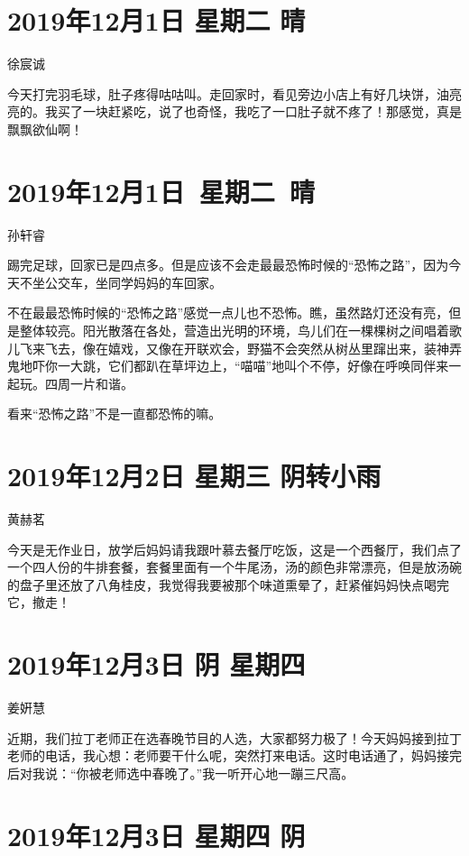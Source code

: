 \section{2019年12月1日 星期二 晴}

徐宸诚

今天打完羽毛球，肚子疼得咕咕叫。走回家时，看见旁边小店上有好几块饼，油亮亮的。我买了一块赶紧吃，说了也奇怪，我吃了一口肚子就不疼了！那感觉，真是飘飘欲仙啊！

\section{2019年12月1日~星期二~晴}

孙轩睿

踢完足球，回家已是四点多。但是应该不会走最最恐怖时候的``恐怖之路''，因为今天不坐公交车，坐同学妈妈的车回家。

不在最最恐怖时候的``恐怖之路''感觉一点儿也不恐怖。瞧，虽然路灯还没有亮，但是整体较亮。阳光散落在各处，营造出光明的环境，鸟儿们在一棵棵树之间唱着歌儿飞来飞去，像在嬉戏，又像在开联欢会，野猫不会突然从树丛里蹿出来，装神弄鬼地吓你一大跳，它们都趴在草坪边上，``喵喵''地叫个不停，好像在呼唤同伴来一起玩。四周一片和谐。

看来``恐怖之路''不是一直都恐怖的嘛。~

\section{2019年12月2日 星期三 阴转小雨}

黄赫茗

今天是无作业日，放学后妈妈请我跟叶慕去餐厅吃饭，这是一个西餐厅，我们点了一个四人份的牛排套餐，套餐里面有一个牛尾汤，汤的颜色非常漂亮，但是放汤碗的盘子里还放了八角桂皮，我觉得我要被那个味道熏晕了，赶紧催妈妈快点喝完它，撤走！

\section{2019年12月3日 阴 星期四}

姜姸慧

近期，我们拉丁老师正在选春晚节目的人选，大家都努力极了！今天妈妈接到拉丁老师的电话，我心想：老师要干什么呢，突然打来电话。这时电话通了，妈妈接完后对我说：``你被老师选中春晚了。''我一听开心地一蹦三尺高。

\section{2019年12月3日 星期四 阴}

